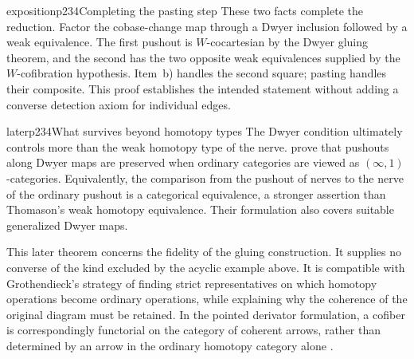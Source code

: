 \begin{dcomment}{exposition}{p234}{Completing the pasting step}
These two facts complete the reduction. Factor the cobase-change map through a Dwyer inclusion followed by a weak equivalence. The first pushout is $W$-cocartesian by the Dwyer gluing theorem, and the second has the two opposite weak equivalences supplied by the $W$-cofibration hypothesis. Item~b) handles the second square; pasting handles their composite. This proof establishes the intended statement without adding a converse detection axiom for individual edges.
\end{dcomment}

\begin{dcomment}{later}{p234}{What survives beyond homotopy types}
The Dwyer condition ultimately controls more than the weak homotopy type of the nerve. \citet[Theorems 1.5 and 1.6; arXiv version 3]{HackneyOzornovaRiehlRovelli2024} prove that pushouts along Dwyer maps are preserved when ordinary categories are viewed as $(\infty,1)$-categories. Equivalently, the comparison from the pushout of nerves to the nerve of the ordinary pushout is a categorical equivalence, a stronger assertion than Thomason's weak homotopy equivalence. Their formulation also covers suitable generalized Dwyer maps.

This later theorem concerns the fidelity of the gluing construction. It supplies no converse of the kind excluded by the acyclic example above. It is compatible with Grothendieck's strategy of finding strict representatives on which homotopy operations become ordinary operations, while explaining why the coherence of the original diagram must be retained. In the pointed derivator formulation, a cofiber is correspondingly functorial on the category of coherent arrows, rather than determined by an arrow in the ordinary homotopy category alone \citep[Definition 3.18]{Groth2013}.
\end{dcomment}
